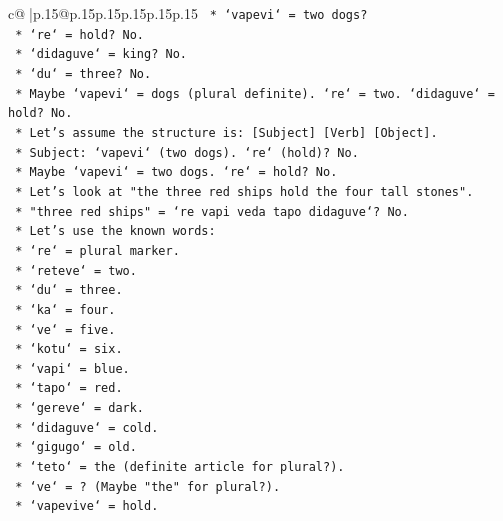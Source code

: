 \documentclass{article}
\begin{document}
{\begin{supertabular}{c@{$\;$}|p{.15\linewidth}@{}p{.15\linewidth}p{.15\linewidth}p{.15\linewidth}p{.15\linewidth}p{.15\linewidth}}
{{{\texttt{                    *   `vapevi` = two dogs?} \\
\texttt{                    *   `re` = hold? No.} \\
\texttt{                    *   `didaguve` = king? No.} \\
\texttt{                    *   `du` = three? No.} \\
\texttt{                    *   Maybe `vapevi` = dogs (plural definite). `re` = two. `didaguve` = hold? No.} \\
\texttt{                    *   Let's assume the structure is: {[}Subject{]} {[}Verb{]} {[}Object{]}.} \\
\texttt{                    *   Subject: `vapevi` (two dogs). `re` (hold)? No.} \\
\texttt{                    *   Maybe `vapevi` = two dogs. `re` = hold? No.} \\
\texttt{                    *   Let's look at "the three red ships hold the four tall stones".} \\
\texttt{                    *   "three red ships" = `re vapi veda tapo didaguve`? No.} \\
\texttt{                    *   Let's use the known words:} \\
\texttt{                        *   `re` = plural marker.} \\
\texttt{                        *   `reteve` = two.} \\
\texttt{                        *   `du` = three.} \\
\texttt{                        *   `ka` = four.} \\
\texttt{                        *   `ve` = five.} \\
\texttt{                        *   `kotu` = six.} \\
\texttt{                        *   `vapi` = blue.} \\
\texttt{                        *   `tapo` = red.} \\
\texttt{                        *   `gereve` = dark.} \\
\texttt{                        *   `didaguve` = cold.} \\
\texttt{                        *   `gigugo` = old.} \\
\texttt{                        *   `teto` = the (definite article for plural?).} \\
\texttt{                        *   `ve` = ? (Maybe "the" for plural?).} \\
\texttt{                        *   `vapevive` = hold.} \\
}}}
\end{supertabular}}
\end{document}
